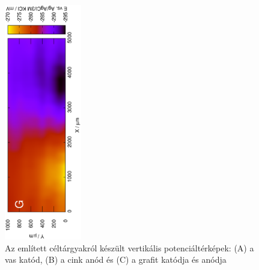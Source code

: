 \begin{figure}
\includegraphics[width=0.3\textwidth, angle=-90]{img/mérések/grafit_v.eps}


\caption{Az említett céltárgyakról készült vertikális potenciáltérképek:
(A) a vas katód, (B) a cink anód és (C) a grafit katódja és anódja}
\label{fig:vertikális}
\end{figure}


